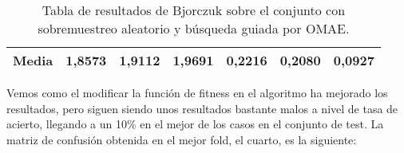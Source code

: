 \begin{table}[H]
{\begin{tabular}{|ccccccc|}
\multicolumn{1}{|c|}{\textbf{Media}}   & \multicolumn{1}{c|}{1,8573}           & \multicolumn{1}{c|}{1,9112}             & \multicolumn{1}{c|}{1,9691}          & \multicolumn{1}{c|}{0,2216}            & \multicolumn{1}{c|}{0,2080}              & 0,0927          \\ \hline
\end{tabular}%
}
\caption{Tabla de resultados de Bjorczuk sobre el conjunto con sobremuestreo aleatorio y búsqueda guiada por OMAE.}\label{tablaBJORCZUKconOMAE}
\end{table}



Vemos como el modificar la función de fitness en el algoritmo ha mejorado los resultados, pero siguen siendo unos resultados bastante malos a nivel de tasa de acierto, llegando a un 10\% en el mejor de los casos en el conjunto de test. La matriz de confusión obtenida en el mejor fold, el cuarto, es la siguiente:


